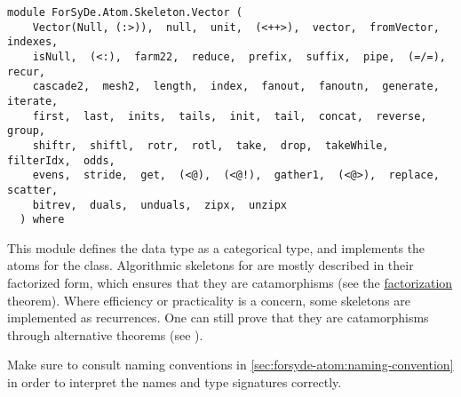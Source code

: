 \label{module:ForSyDe.Atom.Skeleton.Vector}
\haddockbeginheader
{\haddockverb\begin{verbatim}
module ForSyDe.Atom.Skeleton.Vector (
    Vector(Null, (:>)),  null,  unit,  (<++>),  vector,  fromVector,  indexes, 
    isNull,  (<:),  farm22,  reduce,  prefix,  suffix,  pipe,  (=/=),  recur, 
    cascade2,  mesh2,  length,  index,  fanout,  fanoutn,  generate,  iterate, 
    first,  last,  inits,  tails,  init,  tail,  concat,  reverse,  group, 
    shiftr,  shiftl,  rotr,  rotl,  take,  drop,  takeWhile,  filterIdx,  odds, 
    evens,  stride,  get,  (<@),  (<@!),  gather1,  (<@>),  replace,  scatter, 
    bitrev,  duals,  unduals,  zipx,  unzipx
  ) where\end{verbatim}}
\haddockendheader

This module defines the data type  as a categorical type,
 and implements the atoms for the 
 class. Algorithmic skeletons for  are mostly described in
 their factorized form, which ensures that they are catamorphisms
 (see the \href{ForSyDe-Atom-Skeleton.html#factorization}{factorization}
 theorem). Where efficiency or practicality is a concern, some
 skeletons are implemented as recurrences. One can still prove that
 they are catamorphisms through alternative theorems (see
 \cite{Skillicorn05}).\par
\begin{mdframed}[style=reminder,frametitle=Reminder]Make sure to consult naming conventions in  \cref{sec:forsyde-atom:naming-convention} in order to interpret the names and type signatures correctly.\end{mdframed}\par

